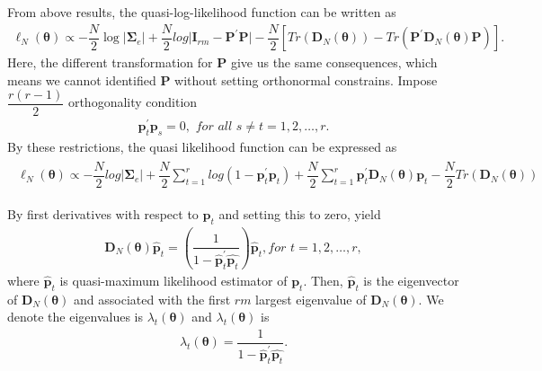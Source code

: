 \documentclass[12pt,a4paper,hyperref]{article}
\begin{document}
From above results, the quasi-log-likelihood function can be written as
\begin{align}
\ell_{N} ( \boldsymbol{\theta}) \propto-\dfrac{N}{2}\log \vert\boldsymbol{\Sigma}_{e} \vert + \dfrac{N}{2} log \vert \boldsymbol{I}_{rm}-\boldsymbol{P}^{'}\boldsymbol{P}\vert-\dfrac{N}{2}\left[Tr\left( \boldsymbol{D}_{N}(\boldsymbol{\theta}) \right)-Tr \left( \boldsymbol{P}^{'}\boldsymbol{D}_{N}(\boldsymbol{\theta})\boldsymbol{P} \right)  \right].
\end{align}
Here, the different transformation for $\boldsymbol{P}$ give us the same consequences, which means we cannot identified $\boldsymbol{P}$ without setting orthonormal constrains.
Impose $\dfrac{r\left(r-1\right)}{2}$ orthogonality condition
\begin{align}
\boldsymbol{p}_{t}^{'}\boldsymbol{p}_{s}=0, \,\,for \,\, all \,\,  s \neq t=1,2,\ldots,r.
\end{align}
By these restrictions, the quasi likelihood function can be expressed as
\begin{align}
\begin{split}
\ell_{N} ( \boldsymbol{\theta}) \propto - \dfrac{N}{2} log \vert \boldsymbol{\Sigma}_{e}  \vert+\dfrac{N}{2} \sum^{r}_{t=1}log\left( 1-\boldsymbol{p}^{'}_{t}\boldsymbol{p}_{t} \right)
+\dfrac{N}{2} \sum^{r}_{t=1}\boldsymbol{p}^{'}_{t}\boldsymbol{D}_{N}(\boldsymbol{\theta})\boldsymbol{p}_{t}-\dfrac{N}{2}Tr\left( \boldsymbol{D}_{N}(\boldsymbol{\theta})\right)
\end{split}
\end{align}

By first derivatives with respect to $\boldsymbol{p}_{t}$ and setting this to zero, yield
\begin{align}
\boldsymbol{D}_{N}(\boldsymbol{\theta})\boldsymbol{\hat{\boldsymbol{p}}}_{t}= \left( \dfrac{1}{1-\hat{\boldsymbol{p}}^{'}_{t}\hat{\boldsymbol{p}_{t}}}   \right) \hat{\boldsymbol{p}}_{t}, for\,\, t=1,2,\ldots,r,
\end{align}
where $\hat{\boldsymbol{p}}_{t}$ is quasi-maximum likelihood estimator of $\boldsymbol{p}_{t}$. Then, $\boldsymbol{\hat{\boldsymbol{p}}}_{t}$ is the eigenvector of $\boldsymbol{D}_{N}(\boldsymbol{\theta})$ and associated with the first $rm$ largest eigenvalue of $\boldsymbol{D}_{N}(\boldsymbol{\theta})$.
We denote the eigenvalues is $\lambda_{t}(\boldsymbol{\theta})$ and $\lambda_{t}(\boldsymbol{\theta})$ is
\begin{align}
\lambda_{t}(\boldsymbol{\theta})= \dfrac{1}{1-\hat{\boldsymbol{p}}^{'}_{t}\hat{\boldsymbol{p}_{t}}} .
\end{align}
\end{document}

